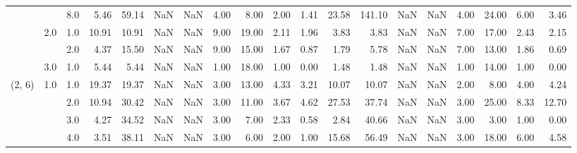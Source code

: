 \begin{tabular}{lllrrrrrrrrrrrrrrrr}
       &     & 8.0  &      5.46 &      59.14 &               NaN &                NaN &  4.00 &   8.00 &             2.00 &                         1.41 &     23.58 &     141.10 &               NaN &                NaN & 4.00 &  24.00 &             6.00 &                         3.46 \\
       & 2.0 & 1.0  &     10.91 &      10.91 &               NaN &                NaN &  9.00 &  19.00 &             2.11 &                         1.96 &      3.83 &       3.83 &               NaN &                NaN & 7.00 &  17.00 &             2.43 &                         2.15 \\
       &     & 2.0  &      4.37 &      15.50 &               NaN &                NaN &  9.00 &  15.00 &             1.67 &                         0.87 &      1.79 &       5.78 &               NaN &                NaN & 7.00 &  13.00 &             1.86 &                         0.69 \\
       & 3.0 & 1.0  &      5.44 &       5.44 &               NaN &                NaN &  1.00 &  18.00 &             1.00 &                         0.00 &      1.48 &       1.48 &               NaN &                NaN & 1.00 &  14.00 &             1.00 &                         0.00 \\
(2, 6) & 1.0 & 1.0  &     19.37 &      19.37 &               NaN &                NaN &  3.00 &  13.00 &             4.33 &                         3.21 &     10.07 &      10.07 &               NaN &                NaN & 2.00 &   8.00 &             4.00 &                         4.24 \\
       &     & 2.0  &     10.94 &      30.42 &               NaN &                NaN &  3.00 &  11.00 &             3.67 &                         4.62 &     27.53 &      37.74 &               NaN &                NaN & 3.00 &  25.00 &             8.33 &                        12.70 \\
       &     & 3.0  &      4.27 &      34.52 &               NaN &                NaN &  3.00 &   7.00 &             2.33 &                         0.58 &      2.84 &      40.66 &               NaN &                NaN & 3.00 &   3.00 &             1.00 &                         0.00 \\
       &     & 4.0  &      3.51 &      38.11 &               NaN &                NaN &  3.00 &   6.00 &             2.00 &                         1.00 &     15.68 &      56.49 &               NaN &                NaN & 3.00 &  18.00 &             6.00 &                         4.58 \\

\end{tabular}
